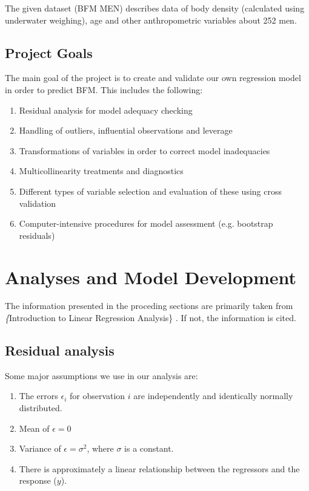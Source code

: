 \documentclass[11pt]{article}
\begin{document}
The given dataset (BFM MEN) describes data of body density (calculated using underwater weighing), 
age and other anthropometric variables about 252 men.

\subsection{Project Goals}
\label{sec:orga735cdd}

The main goal of the project is to create and validate our own regression model in order to predict BFM.
This includes the following:

\begin{enumerate}
\item Residual analysis for model adequacy checking
\item Handling of outliers, influential observations and leverage
\item Transformations of variables in order to correct model inadequacies
\item Multicollinearity treatments and diagnostics
\item Different types of variable selection and evaluation of these using cross validation
\item Computer-intensive procedures for model assessment (e.g. bootstrap residuals)
\end{enumerate}

\newpage
\section{Analyses and Model Development}
\label{sec:org4a56173}

The information presented in the proceding sections are primarily taken from \textit\{Introduction to
Linear Regression Analysis\} \cite{Montgomery2012}. If not, the information is cited.

\subsection{Residual analysis}
\label{sec:orgb4bdb08}

Some major assumptions we use in our analysis are:

\begin{enumerate}
\item The errors \(\epsilon_i\) for observation \(i\) are independently and identically normally distributed.
\item Mean of \(\epsilon = 0\)
\item Variance of \(\epsilon = \sigma^2\), where \(\sigma\) is a constant.
\item There is approximately a linear relationship between the regressors and the response (\(y\)).
\end{enumerate}
\end{document}

